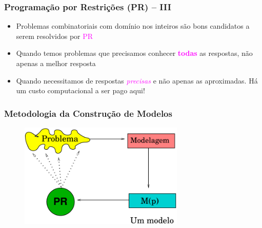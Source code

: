 \begin{frame}[fragile]
\frametitle{Programação por Restrições (PR) -- III}

   \begin{block}{}
     \begin{itemize}
    \item Problemas combinatoriais com domínio nos inteiros são bons candidatos a serem
       resolvidos por \textcolor{magenta}{PR}
      
       \pause
       \item Quando temos problemas que precisamos conhecer \textcolor{magenta}{\textbf{todas}} as respostas, 
    não apenas a melhor resposta
    
      \pause
      \item Quando necessitamos de respostas \textcolor{magenta}{\textit{precisas}} e não apenas as aproximadas.
       Há um custo  computacional a ser pago aqui!
      
    \end{itemize}
    \end{block}
    
\end{frame}



\begin{frame}[fragile]

\frametitle{Metodologia da  Construção de Modelos}

\begin{figure}[ht!]
\begin{center}

\includegraphics[width=0.70\textwidth, height=0.60\textheight]{figures/problema_modelagem.pdf}

\end{center}
\end{figure}


    
\end{frame}



